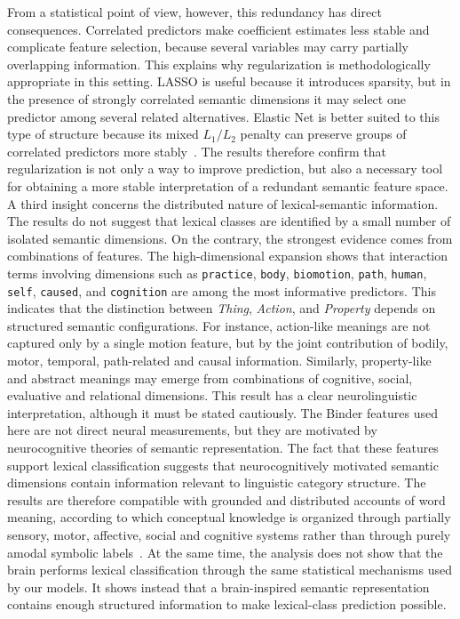 \documentclass{ipgpmaster}
\begin{document}
From a statistical point of view, however, this redundancy has direct consequences. Correlated predictors make coefficient estimates less stable and complicate feature selection, because several variables may carry partially overlapping information. This explains why regularization is methodologically appropriate in this setting. LASSO is useful because it introduces sparsity, but in the presence of strongly correlated semantic dimensions it may select one predictor among several related alternatives. Elastic Net is better suited to this type of structure because its mixed \(L_1/L_2\) penalty can preserve groups of correlated predictors more stably~\cite{tibshirani1996regression,zou2005regularization,friedman2010regularization}. The results therefore confirm that regularization is not only a way to improve prediction, but also a necessary tool for obtaining a more stable interpretation of a redundant semantic feature space.
A third insight concerns the distributed nature of lexical-semantic information. The results do not suggest that lexical classes are identified by a small number of isolated semantic dimensions. On the contrary, the strongest evidence comes from combinations of features. The high-dimensional expansion shows that interaction terms involving dimensions such as \texttt{practice}, \texttt{body}, \texttt{biomotion}, \texttt{path}, \texttt{human}, \texttt{self}, \texttt{caused}, and \texttt{cognition} are among the most informative predictors. This indicates that the distinction between \emph{Thing}, \emph{Action}, and \emph{Property} depends on structured semantic configurations. For instance, action-like meanings are not captured only by a single motion feature, but by the joint contribution of bodily, motor, temporal, path-related and causal information. Similarly, property-like and abstract meanings may emerge from combinations of cognitive, social, evaluative and relational dimensions.
This result has a clear neurolinguistic interpretation, although it must be stated cautiously. The Binder features used here are not direct neural measurements, but they are motivated by neurocognitive theories of semantic representation. The fact that these features support lexical classification suggests that neurocognitively motivated semantic dimensions contain information relevant to linguistic category structure. The results are therefore compatible with grounded and distributed accounts of word meaning, according to which conceptual knowledge is organized through partially sensory, motor, affective, social and cognitive systems rather than through purely amodal symbolic labels~\cite{barsalou1999perceptual,meteyard2012coming,binder2016toward}. At the same time, the analysis does not show that the brain performs lexical classification through the same statistical mechanisms used by our models. It shows instead that a brain-inspired semantic representation contains enough structured information to make lexical-class prediction possible.
\end{document}
